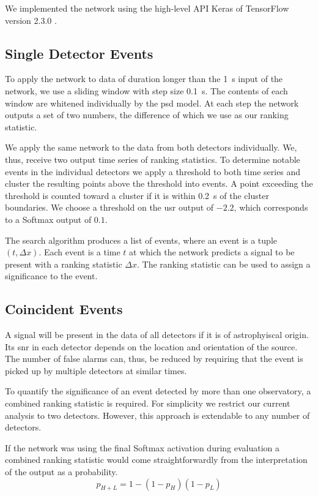 We implemented the network using the high-level API Keras \cite{Chollet:2015aaa} of TensorFlow version 2.3.0 \cite{Abadi:2015aaa}.

\subsection{Single Detector Events}\label{sec:methods:single_det}
To apply the network to data of duration longer than the \SI{1}{\second} input of the network, we use a sliding window with step size \SI{0.1}{\second}. The contents of each window are whitened individually by the \acrshort{psd} model. At each step the network outputs a set of two numbers, the difference of which we use as our ranking statistic.

We apply the same network to the data from both detectors individually. We, thus, receive two output time series of ranking statistics. To determine notable events in the individual detectors we apply a threshold to both time series and cluster the resulting points above the threshold into events. A point exceeding the threshold is counted toward a cluster if it is within \SI{0.2}{\second} of the cluster boundaries. We choose a threshold on the \acrshort{usr} output of $-2.2$, which corresponds to a Softmax output of $0.1$.

The search algorithm produces a list of events, where an event is a tuple $\left(t, {\Delta x}\right)$. Each event is a time $t$ at which the network predicts a signal to be present with a ranking statistic ${\Delta x}$. The ranking statistic can be used to assign a significance to the event.

\subsection{Coincident Events}\label{sec:methods:coincs}
A signal will be present in the data of all detectors if it is of astrophyiscal origin. Its \acrshort{snr} in each detector depends on the location and orientation of the source. The number of false alarms can, thus, be reduced by requiring that the event is picked up by multiple detectors at similar times.

To quantify the significance of an event detected by more than one observatory, a combined ranking statistic is required. For simplicity we restrict our current analysis to two detectors. However, this approach is extendable to any number of detectors.

If the network was using the final Softmax activation during evaluation a combined ranking statistic would come straightforwardly from the interpretation of the output as a probability.
\begin{equation}\label{eq:combined_ranking_prob}
p_{H+L} = 1 - \left(1 - p_H\right)\left(1 - p_L\right)
\end{equation}

